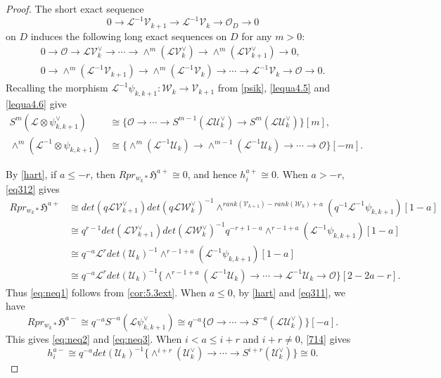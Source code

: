 \documentclass[10pt,a4paper]{amsart}
\newcommand\mc{\mathcal}
\newcommand\mf{\mathfrak}
\begin{document}
\begin{proof}
The short exact sequence
  $$0\to \mc{L}^{-1}\mc{V}_{k+1}\to \mc{L}^{-1}\mc{V}_{k}\to \mc{O}_{D}\to 0$$
  on $D$ induces the following long exact sequences on $D$ for any $m>0$:
\begin{align}
  \label{lequa4.5}  0 \to \mc{O} \to \mc{L}\mc{V}_{k}^{\vee} \to \cdots \to \wedge^{m}(\mc{L}\mc{V}_{k}^{\vee})\to \wedge^{m}(\mc{L}\mc{V}_{k+1}^{\vee})\to 0,\\
 \label{lequa4.6} 0\to \wedge^{m}(\mc{L}^{-1}\mc{V}_{k+1})\to \wedge^{m}(\mc{L}^{-1}\mc{V}_{k})\to \cdots \to \mc{L}^{-1}\mc{V}_{k}\to \mc{O}\to 0. 
\end{align}
Recalling the morphism $\mc{L}^{-1}\psi_{k,k+1}:\mc{W}_{k}\to \mc{V}_{k+1}$ from \cref{psik}, \cref{lequa4.5} and \cref{lequa4.6} give
\begin{align}
    \label{eq311}
  S^{m}(\mc{L}\otimes \psi_{k,k+1}^{\vee})&\cong \{\mc{O}\to \cdots \to S^{m-1}(\mc{L}\mc{U}_{k}^{\vee})\to S^{m}(\mc{L}\mc{U}_{k}^{\vee})\}[m],\\
  \label{eq312}
  \wedge^{m}(\mc{L}^{-1}\otimes \psi_{k,k+1})&\cong \{\wedge^{m}(\mc{L}^{-1}\mc{U}_{k})\to \wedge^{m-1}(\mc{L}^{-1}\mc{U}_{k})\to \cdots \to \mc{O}\}[-m].
\end{align}

By \cref{hart}, if $a\leq -r$, then $Rpr_{w_{k}*}\mf{H}^{a+}\cong0$, and hence $h_{i}^{a+}\cong0$. When $a> -r$, \cref{eq312} gives
\begin{align*}
  Rpr_{w_{k}*}\mf{H}^{a+}
                         &\cong det(q\mc{L}\mc{V}_{k+1}^{\vee})det(q\mc{L}\mc{W}_{k}^{\vee})^{-1}\wedge^{rank(\mc{V}_{k+1})-rank(\mc{W}_{k})+a}(q^{-1}\mc{L}^{-1}\psi_{k,k+1})[1-a] \\
                         &\cong q^{r-1}det(\mc{L}\mc{V}_{k+1}^{\vee})det(\mc{L}\mc{W}_{k}^{\vee})^{-1}q^{-r+1-a}\wedge^{r-1+a}(\mc{L}^{-1}\psi_{k,k+1})[1-a] \\
                         &\cong q^{-a}\mc{L}^{r}det(\mc{U}_{k})^{-1}\wedge^{r-1+a}(\mc{L}^{-1}\psi_{k,k+1})[1-a] \\
                       &\cong q^{-a}\mc{L}^{r}det(\mc{U}_{k})^{-1}\{\wedge^{r-1+a}(\mc{L}^{-1}\mc{U}_{k})\to \cdots \to \mc{L}^{-1}\mc{U}_{k}\to \mc{O}\}[2-2a-r]. 
\end{align*}
Thus \cref{eq:neq1} follows from \cref{cor:5.3ext}. When $a\leq 0$, by \cref{hart} and \cref{eq311}, we have
\begin{equation}
  \label{714}
  Rpr_{w_{k}*}\mf{H}^{a-}\cong q^{-a}S^{-a}(\mc{L}\psi_{k,k+1}^{\vee})\cong q^{-a}\{\mc{O}\to \cdots \to S^{-a}(\mc{L}\mc{U}_{k}^{\vee})\}[-a].
\end{equation}
This gives \cref{eq:neq2} and \cref{eq:neq3}. When $i<a\leq i+r$ and $i+r\neq 0$, \cref{714} gives
$$h_{i}^{a-}\cong q^{-a}det(\mc{U}_{k})^{-1}\{\wedge^{i+r}(\mc{U}_{k}^{\vee})\to \cdots \to S^{i+r}(\mc{U}_{k}^{\vee})\}\cong0.$$


\end{proof}
\end{document}
